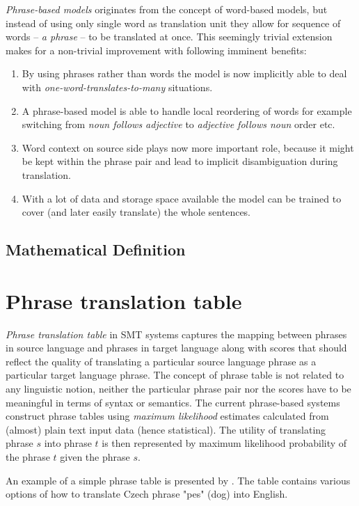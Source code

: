 \emph{Phrase-based models} originates from the concept of word-based models,
but instead of using only single word as translation unit they
allow for sequence of words -- \emph{a phrase} -- to be translated at once.
This seemingly trivial extension makes for a non-trivial improvement
with following imminent benefits:
\begin{enumerate}
  \item By using phrases rather than words the model is now implicitly able to deal with
    \emph{one-word-translates-to-many} situations.
  \item A phrase-based model is able to handle local reordering of words for example switching
    from \emph{noun follows adjective} to \emph{adjective follows noun} order etc.
  \item Word context on source side plays now more important role, because it might be kept
    within the phrase pair and lead to implicit disambiguation during translation.
  \item With a lot of data and storage space available the model can be trained to cover
    (and later easily translate) the whole sentences.
\end{enumerate}


\subsection{Mathematical Definition}


\section{Phrase translation table}

\emph{Phrase translation table} in SMT systems captures the mapping
between phrases in source language and phrases in target language
along with scores that should reflect the quality of translating a particular
source language phrase as a particular target language phrase.
The concept of phrase table is not related to any linguistic notion,
neither the particular phrase pair nor the scores have to be meaningful
in terms of syntax or semantics. The current phrase-based systems construct
phrase tables using \emph{maximum likelihood} estimates calculated from (almost)
plain text input data (hence statistical). The utility of translating phrase
$s$ into phrase $t$ is then represented by maximum likelihood probability of
the phrase $t$ given the phrase $s$.

An example of a simple phrase table is presented by .
The table contains various options of how to translate Czech phrase
"pes" (dog) into English.


